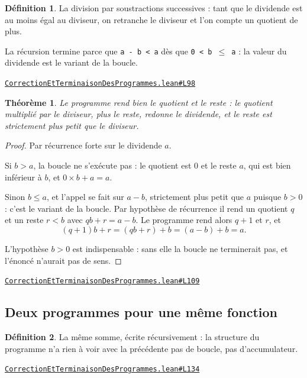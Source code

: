\documentclass[11pt,a4paper]{article}
\theoremstyle{definition}
\newtheorem{definition}{Définition}
\theoremstyle{plain}
\newtheorem{theoreme}{Théorème}
\newcommand{\source}[2]{\par\smallskip\noindent\hfill{\footnotesize\href{#1}{\texttt{#2}}}\par\smallskip}
\begin{document}
\begin{definition}
La division par soustractions successives : tant que le dividende est au moins
égal au diviseur, on retranche le diviseur et l'on compte un quotient de plus.

La récursion termine parce que \texttt{a - b < a} dès que \texttt{0 < b \(\le\) a} : la valeur du
dividende est le variant de la boucle.
\end{definition}
\source{https://github.com/Commutator-IO/learn-lean/blob/main/courses/02-lycee/11-informatique-nsi/CorrectionEtTerminaisonDesProgrammes.lean\#L98}{CorrectionEtTerminaisonDesProgrammes.lean\#L98}

\begin{theoreme}
Le programme rend bien le quotient et le reste : le quotient multiplié par le
diviseur, plus le reste, redonne le dividende, et le reste est strictement plus petit
que le diviseur.
\end{theoreme}
\begin{proof}
Par récurrence forte sur le dividende \(a\).

Si \(b > a\), la boucle ne s'exécute pas : le quotient est \(0\) et le reste \(a\), qui
est bien inférieur à \(b\), et \(0 \times b + a = a\).

Sinon \(b \le a\), et l'appel se fait sur \(a - b\), strictement plus petit que \(a\)
puisque \(b > 0\) : c'est le variant de la boucle. Par hypothèse de récurrence il rend
un quotient \(q\) et un reste \(r < b\) avec \(qb + r = a - b\). Le programme rend alors
\(q + 1\) et \(r\), et
\[ (q+1)b + r = (qb + r) + b = (a - b) + b = a . \]

L'hypothèse \(b > 0\) est indispensable : sans elle la boucle ne terminerait pas, et
l'énoncé n'aurait pas de sens.
\end{proof}
\source{https://github.com/Commutator-IO/learn-lean/blob/main/courses/02-lycee/11-informatique-nsi/CorrectionEtTerminaisonDesProgrammes.lean\#L109}{CorrectionEtTerminaisonDesProgrammes.lean\#L109}

\subsection{Deux programmes pour une même fonction}

\begin{definition}
La même somme, écrite récursivement : la structure du programme n'a rien à voir
avec la précédente \textemdash{} pas de boucle, pas d'accumulateur.
\end{definition}
\source{https://github.com/Commutator-IO/learn-lean/blob/main/courses/02-lycee/11-informatique-nsi/CorrectionEtTerminaisonDesProgrammes.lean\#L134}{CorrectionEtTerminaisonDesProgrammes.lean\#L134}
\end{document}
